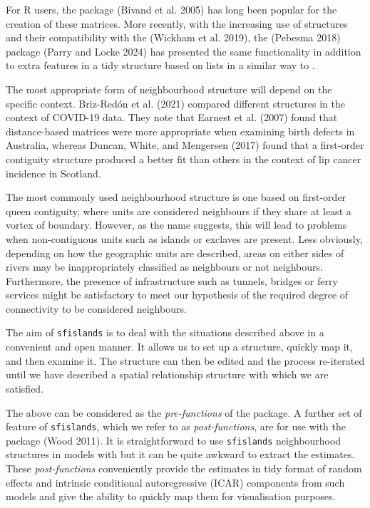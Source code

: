 For R users, the  package (Bivand et al. 2005) has long been popular for the
creation of these matrices. More recently, with the increasing use of 
structures and their compatibility with the  (Wickham et al. 2019), the  (Pebesma 2018) package (Parry and Locke 2024) has presented the same
functionality in addition to extra features in a tidy structure based on
lists in a similar way to .

The most appropriate form of neighbourhood structure will depend on the specific context. Briz-Redón et al. (2021) compared different structures in the context of COVID-19 data. They note that Earnest et al. (2007) found that distance-based matrices were more appropriate when examining birth defects in Australia, whereas Duncan, White, and Mengersen (2017) found that a first-order contiguity structure produced a better fit than others in the context of lip cancer incidence in Scotland.

The most commonly used neighbourhood structure is one based on first-order queen contiguity, where units are considered neighbours if they
share at least a vortex of boundary. However, as the name suggests, this
will lead to problems when non-contiguous units such as islands or
exclaves are present. Less obviously, depending on how the geographic
units are described, areas on either sides of rivers may be
inappropriately classified as neighbours or not neighbours. Furthermore,
the presence of infrastructure such as tunnels, bridges or ferry
services might be satisfactory to meet our hypothesis of the required
degree of connectivity to be considered neighbours.

The aim of \texttt{sfislands} is to deal with the situations described above in a
convenient and open manner. It allows us to set up a structure, quickly
map it, and then examine it. The structure can then be edited and the process re-iterated until we have described a
spatial relationship structure with which we are satisfied.

The above can be considered as the \emph{pre-functions} of the package. A
further set of feature of \texttt{sfislands}, which we refer to as \emph{post-functions},
are for use with the  package (Wood 2011). It is straightforward to use
\texttt{sfislands} neighbourhood structures in models with  but it can be quite awkward
to extract the estimates. These \emph{post-functions} conveniently provide the estimates in tidy format of random effects and intrinsic conditional autoregressive (ICAR) components from such models and give the ability to quickly map them for visualisation purposes.

